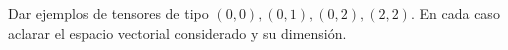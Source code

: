 \item Dar ejemplos de tensores de tipo $(0,0),(0,1),(0,2),(2,2).$ En cada caso aclarar el espacio vectorial considerado y su dimensión.
    \begin{mdframed}[style=s]
        
    \end{mdframed}